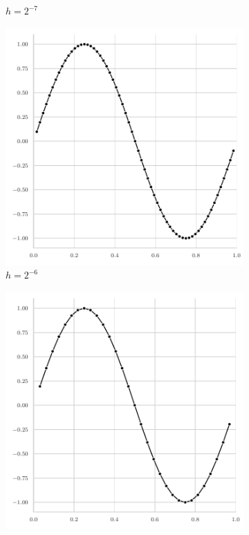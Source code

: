 \begin{figure}[t]
\begin{subfigure}[b]{0.32\textwidth}
		\caption{$h = 2^{-7}$}
	\end{subfigure}
	\hfill
	\begin{subfigure}[b]{0.32\textwidth}
		\centering
		\includegraphics[width=\textwidth]{figures/error_plots//initial_error_2pi_level6.pdf}
		\caption{$h = 2^{-6}$}
	\end{subfigure}
	\hfill
	\begin{subfigure}[b]{0.32\textwidth}
		\centering
		\includegraphics[width=\textwidth]{figures/error_plots//initial_error_2pi_level5.pdf}

\end{subfigure}
\end{figure}
